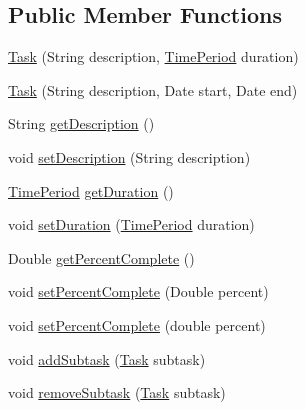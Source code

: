 \subsection*{Public Member Functions}
\begin{DoxyCompactItemize}
\item 
\mbox{\hyperlink{classorg_1_1jfree_1_1data_1_1gantt_1_1_task_a8c6869db85eec9ecef3e4a9ee2fbb399}{Task}} (String description, \mbox{\hyperlink{interfaceorg_1_1jfree_1_1data_1_1time_1_1_time_period}{Time\+Period}} duration)
\item 
\mbox{\hyperlink{classorg_1_1jfree_1_1data_1_1gantt_1_1_task_a4b9cfe48fe63086cb3521bfdae739f73}{Task}} (String description, Date start, Date end)
\item 
String \mbox{\hyperlink{classorg_1_1jfree_1_1data_1_1gantt_1_1_task_a663fe2b623805aa2b753862e09a62f5e}{get\+Description}} ()
\item 
void \mbox{\hyperlink{classorg_1_1jfree_1_1data_1_1gantt_1_1_task_a2fd2a50d8a77b8f783ec3481b3b46640}{set\+Description}} (String description)
\item 
\mbox{\hyperlink{interfaceorg_1_1jfree_1_1data_1_1time_1_1_time_period}{Time\+Period}} \mbox{\hyperlink{classorg_1_1jfree_1_1data_1_1gantt_1_1_task_a9562b2f5ca9bcce5f07cb33b2ef59392}{get\+Duration}} ()
\item 
void \mbox{\hyperlink{classorg_1_1jfree_1_1data_1_1gantt_1_1_task_a04281bee83c3e14887c3f79680483068}{set\+Duration}} (\mbox{\hyperlink{interfaceorg_1_1jfree_1_1data_1_1time_1_1_time_period}{Time\+Period}} duration)
\item 
Double \mbox{\hyperlink{classorg_1_1jfree_1_1data_1_1gantt_1_1_task_abb694fbc64799ccd7130883dfd07314a}{get\+Percent\+Complete}} ()
\item 
void \mbox{\hyperlink{classorg_1_1jfree_1_1data_1_1gantt_1_1_task_a65d0c00ef5d447498219c70719946394}{set\+Percent\+Complete}} (Double percent)
\item 
void \mbox{\hyperlink{classorg_1_1jfree_1_1data_1_1gantt_1_1_task_a91c50a4358774392ab6e7313f699d553}{set\+Percent\+Complete}} (double percent)
\item 
void \mbox{\hyperlink{classorg_1_1jfree_1_1data_1_1gantt_1_1_task_a41701b06de7b246dc1d24f3b3a02b915}{add\+Subtask}} (\mbox{\hyperlink{classorg_1_1jfree_1_1data_1_1gantt_1_1_task}{Task}} subtask)
\item 
void \mbox{\hyperlink{classorg_1_1jfree_1_1data_1_1gantt_1_1_task_a9c2a06d96bcd9ee827037f01d2f2a8db}{remove\+Subtask}} (\mbox{\hyperlink{classorg_1_1jfree_1_1data_1_1gantt_1_1_task}{Task}} subtask)

\end{DoxyCompactItemize}
